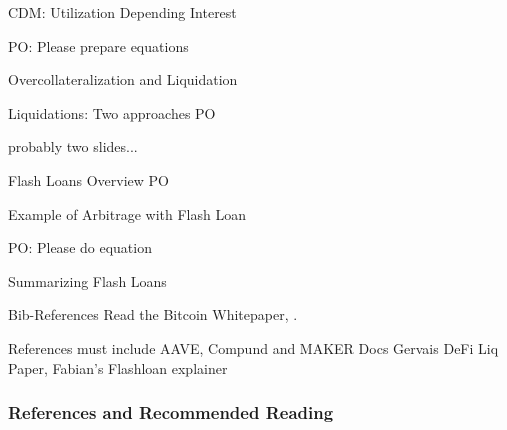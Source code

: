 \documentclass[]{beamer}
\begin{document}
\begin{frame}{CDM: Utilization Depending Interest }

PO: Please prepare equations
	
\end{frame}


\begin{frame}{Overcollateralization and Liquidation}

	
\end{frame}


\begin{frame}{Liquidations: Two approaches PO}

probably two slides...
	
\end{frame}


\begin{frame}{Flash Loans Overview PO}

	
\end{frame}


\begin{frame}{Example of Arbitrage with Flash Loan}

PO: Please do equation
	
\end{frame}


\begin{frame}{Summarizing Flash Loans}

	
\end{frame}


\begin{frame}{Bib-References}
		Read the Bitcoin Whitepaper, \cite{nakamotoBitcoin2008}.
\end{frame}

\begin{frame}%

References must include AAVE, Compund and MAKER Docs
Gervais DeFi Liq Paper, Fabian's Flashloan explainer

\frametitle{References and Recommended Reading}
	
	
\end{frame}
\end{document}
